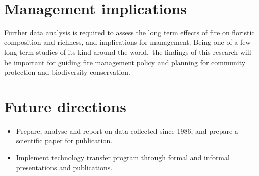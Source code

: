 \documentclass[version=last,
    paper=a4, %
    10pt, %
    usenames,
    dvipsnames,
    oneside, %
    headings=openany, %
    DIV=15 %
]{scrbook}
\begin{document}
~



\section*{Management implications}
Further data analysis is required to assess the long term effects of
fire on floristic composition and richness, and implications for
management. Being one of a few long term studies of its kind around the
world,~the findings of this research will be important for guiding fire
management policy and planning for community protection and biodiversity
conservation.



\section*{Future directions}
\begin{itemize}
\itemsep1pt\parskip0pt
\item
  Prepare, analyse and report on data collected since 1986, and prepare
  a scientific paper for publication.
\item
  Implement technology transfer program through formal and informal
  presentations and publications.
\end{itemize}



\end{document}
